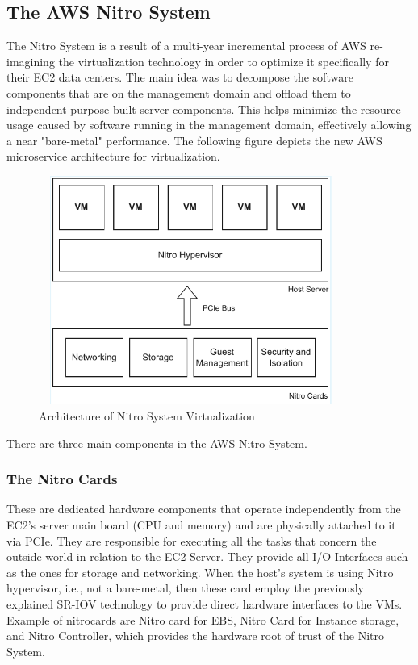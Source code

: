 \subsection{The AWS Nitro System}
The Nitro System is a result of a multi-year incremental process of AWS re-imagining the virtualization 
technology in order to optimize it specifically for their EC2 data centers. The main idea was to decompose 
the software components that are on the management domain and offload them to independent purpose-built server 
components. This helps minimize the resource usage caused by software running in the management domain, 
effectively allowing a near "bare-metal" performance. The following figure depicts the new AWS microservice 
architecture for virtualization. 
\begin{figure}[H]
  \centering
  \includegraphics[width=10cm, height=7.5cm]{figures/nitro}
  \caption{Architecture of Nitro System Virtualization}
  \label{fig:nitro}
\end{figure}
\noindent
There are three main components in the AWS Nitro System. 
\subsubsection{The Nitro Cards}
These are dedicated hardware components that operate independently from the EC2's server main board 
(CPU and memory) and are physically attached to it via PCIe. They are responsible for executing all the 
tasks that concern the outside world in relation to the EC2 Server. They provide all I/O Interfaces such 
as the ones for storage and networking. When the host's system is using Nitro hypervisor, i.e., not a 
bare-metal, then these card employ the previously explained SR-IOV technology to provide direct hardware 
interfaces to the VMs. Example of nitrocards are Nitro card for EBS, Nitro Card for Instance storage, and 
Nitro Controller, which provides the hardware root of trust of the Nitro System. 
